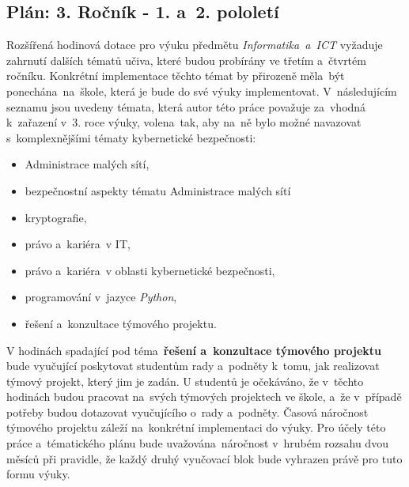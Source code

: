 \documentclass[a4paper, 12pt]{article}
\begin{document}
\subsection{Plán: 3. Ročník - 1. a~2. pololetí}
Rozšířená hodinová dotace pro výuku předmětu \textit{Informatika~a~ICT} vyžaduje zahrnutí dalších tématů učiva, které budou probírány ve třetím a~čtvrtém ročníku. Konkrétní implementace těchto témat by přirozeně měla~být ponechána~na~škole, která je bude do své výuky implementovat. V~následujícím seznamu jsou uvedeny témata, která autor této práce považuje za~vhodná k~zařazení v~3. roce výuky, volena~tak, aby na~ně bylo možné navazovat s~komplexnějšími tématy kybernetické bezpečnosti:

\begin{itemize}
    \setlength{\itemsep}{-3pt}
    \item Administrace malých sítí,
    \item bezpečnostní aspekty tématu Administrace malých sítí
    \item kryptografie,
    \item právo a~kariéra~v IT,
    \item právo a~kariéra~v oblasti kybernetické bezpečnosti,
    \item programování v~jazyce \textit{Python},
    \item řešení a~konzultace týmového projektu.
\end{itemize}

V hodinách spadající pod téma~\textbf{řešení a~konzultace týmového projektu} bude vyučující poskytovat studentům rady a~podněty k~tomu, jak realizovat týmový projekt, který jim je zadán. U studentů je očekáváno, že v~těchto hodinách budou pracovat na~svých týmových projektech ve škole, a~že v~případě potřeby budou dotazovat vyučujícího o~rady a~podněty. Časová náročnost týmového projektu záleží na~konkrétní implementaci do výuky. Pro účely této práce a~tématického plánu bude uvažována~náročnost v~hrubém rozsahu dvou měsíců při pravidle, že každý druhý vyučovací blok bude vyhrazen právě pro tuto formu výuky.
\end{document}
